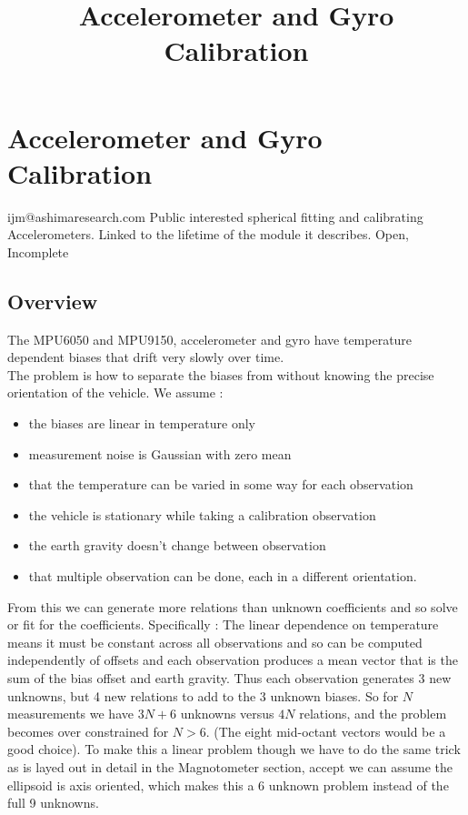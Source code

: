 \documentclass{article}
\begin{document}
\title{Accelerometer and Gyro Calibration}
\section{Accelerometer and Gyro Calibration}
{ijm@ashimaresearch.com}
{Public interested spherical fitting and calibrating Accelerometers.}
{Linked to the lifetime of the module it describes.}
{Open, Incomplete}
\subsection{Overview}
The MPU6050 and MPU9150, accelerometer and gyro have temperature dependent biases that drift very slowly over time.
\\
The problem is how to separate the biases from without knowing the
precise orientation of the vehicle. We assume :\\
\begin{itemize}
\item the biases are linear in temperature only
\item measurement noise is Gaussian with zero mean
\item that the temperature can be varied in some way for each observation
\item the vehicle is stationary while taking a calibration observation
\item the earth gravity doesn't change between observation
\item that multiple observation can be done, each in a different orientation.
\end{itemize}
From this we can generate more relations than unknown coefficients
and so solve or fit for the coefficients.  Specifically :
The linear dependence on temperature means it must be constant
across all observations and so can be computed independently of
offsets and each observation produces a mean vector that is the sum
of the bias offset and earth gravity. Thus each observation 
generates 3 new unknowns, but 4 new relations to
add to the 3 unknown biases. So for $N$ measurements we have $3N+6$
unknowns versus $4N$ relations, and the problem becomes over
constrained for $N>6$.  (The eight mid-octant vectors would be a good choice).
To make this a linear problem though we have to do the same trick as is layed out
in detail in the Magnotometer section, accept we can assume the ellipsoid is axis
oriented, which makes this a 6 unknown problem instead of the full 9 unknowns.
\\
\end{document}
